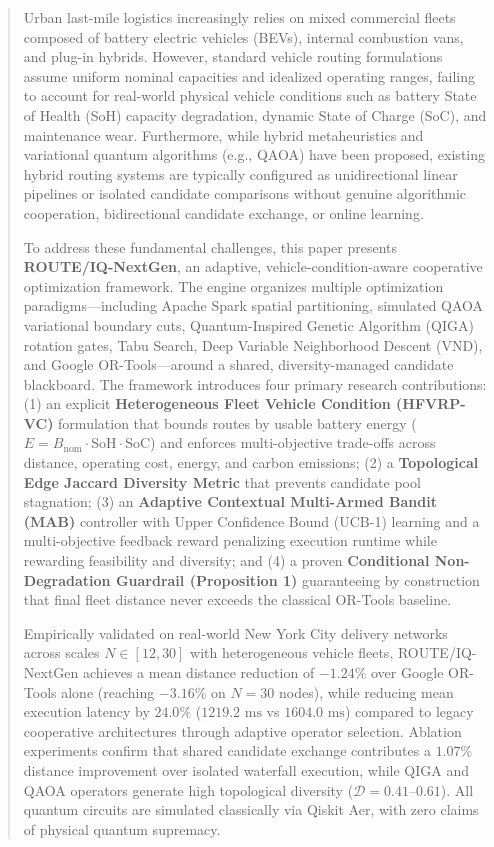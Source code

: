 \documentclass[journal,10pt]{IEEEtran}
\begin{document}
\begin{abstract}
Urban last-mile logistics increasingly relies on mixed commercial fleets composed of battery electric vehicles (BEVs), internal combustion vans, and plug-in hybrids. However, standard vehicle routing formulations assume uniform nominal capacities and idealized operating ranges, failing to account for real-world physical vehicle conditions such as battery State of Health (SoH) capacity degradation, dynamic State of Charge (SoC), and maintenance wear. Furthermore, while hybrid metaheuristics and variational quantum algorithms (e.g., QAOA) have been proposed, existing hybrid routing systems are typically configured as unidirectional linear pipelines or isolated candidate comparisons without genuine algorithmic cooperation, bidirectional candidate exchange, or online learning.

To address these fundamental challenges, this paper presents \textbf{ROUTE/IQ-NextGen}, an adaptive, vehicle-condition-aware cooperative optimization framework. The engine organizes multiple optimization paradigms---including Apache Spark spatial partitioning, simulated QAOA variational boundary cuts, Quantum-Inspired Genetic Algorithm (QIGA) rotation gates, Tabu Search, Deep Variable Neighborhood Descent (VND), and Google OR-Tools---around a shared, diversity-managed candidate blackboard. The framework introduces four primary research contributions: (1) an explicit \textbf{Heterogeneous Fleet Vehicle Condition (HFVRP-VC)} formulation that bounds routes by usable battery energy ($E = B_{\text{nom}} \cdot \text{SoH} \cdot \text{SoC}$) and enforces multi-objective trade-offs across distance, operating cost, energy, and carbon emissions; (2) a \textbf{Topological Edge Jaccard Diversity Metric} that prevents candidate pool stagnation; (3) an \textbf{Adaptive Contextual Multi-Armed Bandit (MAB)} controller with Upper Confidence Bound (UCB-1) learning and a multi-objective feedback reward penalizing execution runtime while rewarding feasibility and diversity; and (4) a proven \textbf{Conditional Non-Degradation Guardrail (Proposition 1)} guaranteeing by construction that final fleet distance never exceeds the classical OR-Tools baseline.

Empirically validated on real-world New York City delivery networks across scales $N \in [12, 30]$ with heterogeneous vehicle fleets, ROUTE/IQ-NextGen achieves a mean distance reduction of \textbf{$-1.24\%$} over Google OR-Tools alone (reaching \textbf{$-3.16\%$} on $N=30$ nodes), while reducing mean execution latency by \textbf{$24.0\%$} ($1219.2\text{ ms}$ vs $1604.0\text{ ms}$) compared to legacy cooperative architectures through adaptive operator selection. Ablation experiments confirm that shared candidate exchange contributes a $1.07\%$ distance improvement over isolated waterfall execution, while QIGA and QAOA operators generate high topological diversity ($\mathcal{D} = 0.41\text{--}0.61$). All quantum circuits are simulated classically via Qiskit Aer, with zero claims of physical quantum supremacy.
\end{abstract}
\end{document}
